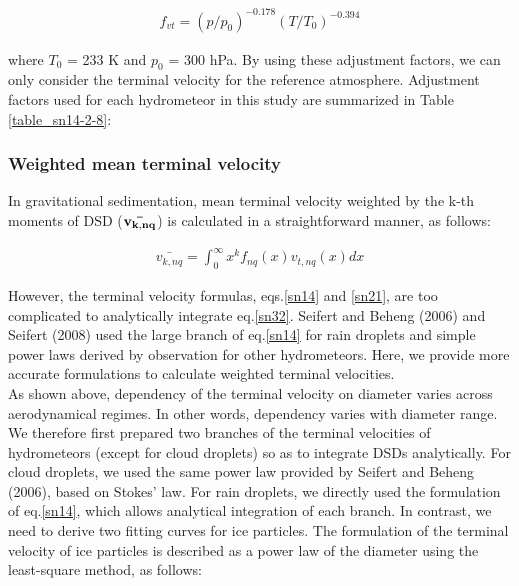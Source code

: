 \begin{eqnarray}
f_{vt}=(p/p_{0})^{-0.178}(T/T_{0})^{-0.394}
\label{sn31}
\end{eqnarray}

where $T_{0}$ = 233 K and $p_{0}$ = 300 hPa. By using these adjustment factors, we can only consider the terminal velocity for the reference atmosphere. Adjustment factors used for each hydrometeor in this study are summarized in Table \ref{table_sn14-2-8}:

\begin{table}[h]
\begin{center}
\caption{Adjustment factor for the reference terminal velocity.}
\label{table_sn14-2-8}
\end{center}
\end{table}


\subsubsection{Weighted mean terminal velocity}
In gravitational sedimentation, mean terminal velocity weighted by the k-th moments of DSD (${\bf \bar{v_{k,nq}}}$) is calculated in a straightforward manner, as follows:

\begin{eqnarray}
\bar{v_{k,nq}}=\int_{0}^{\infty}x^{k}f_{nq}(x)v_{t,nq}(x)dx
\label{sn32}
\end{eqnarray}

However, the terminal velocity formulas, eqs.\ref{sn14} and \ref{sn21}, are too complicated to analytically integrate eq.\ref{sn32}. Seifert and Beheng (2006) and Seifert (2008) used the large branch of eq.\ref{sn14} for rain droplets and simple power laws derived by observation for other hydrometeors. Here, we provide more accurate formulations to calculate weighted terminal velocities.\\
As shown above, dependency of the terminal velocity on diameter varies across aerodynamical regimes. In other words, dependency varies with diameter range. We therefore first prepared two branches of the terminal velocities of hydrometeors (except for cloud droplets) so as to integrate DSDs analytically. For cloud droplets, we used the same power law provided by Seifert and Beheng (2006), based on Stokes’ law. For rain droplets, we directly used the formulation of eq.\ref{sn14}, which allows analytical integration of each branch. In contrast, we need to derive two fitting curves for ice particles. The formulation of the terminal velocity of ice particles is described as a power law of the diameter using the least-square method, as follows:

